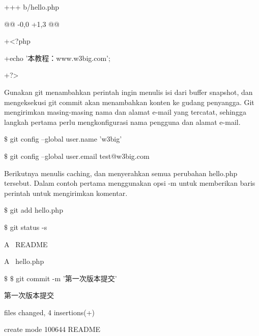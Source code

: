 \noindent 
{\fontsize{10pt}{10pt}\selectfont +++ b/hello.php} \par
\noindent 
{\fontsize{10pt}{10pt}\selectfont @@ -0,0 +1,3 @@} \par
\noindent 
{\fontsize{10pt}{10pt}\selectfont +<?php} \par
\noindent 
{\fontsize{10pt}{10pt}\selectfont +echo '本教程：www.w3big.com';} \par
\noindent 
{\fontsize{10pt}{10pt}\selectfont +?>} \par
\vspace{12pt}
Gunakan git menambahkan perintah ingin menulis isi dari buffer snapshot, dan mengeksekusi git commit akan menambahkan konten ke gudang penyangga. Git mengirimkan masing-masing nama dan alamat e-mail yang tercatat, sehingga langkah pertama perlu mengkonfigurasi nama pengguna dan alamat e-mail.  \par
\noindent 
{\fontsize{10pt}{10pt}\selectfont  $  \$  $ git config --global user.name 'w3big'} \par
\noindent 
{\fontsize{10pt}{10pt}\selectfont  $  \$  $ git config --global user.email test@w3big.com} \par
\noindent 
\vspace{12pt}
\noindent 
\vspace{12pt}
\noindent 
 \hspace*{0.64in} Berikutnya menulis caching, dan menyerahkan semua perubahan hello.php tersebut. Dalam contoh pertama menggunakan opsi -m untuk memberikan baris perintah untuk mengirimkan komentar. \par
\noindent 
{\fontsize{10pt}{10pt}\selectfont  $  \$  $ git add hello.php} \par
\noindent 
{\fontsize{10pt}{10pt}\selectfont  $  \$  $ git status -s} \par
\noindent 
{\fontsize{10pt}{10pt}\selectfont A~ README} \par
\noindent 
{\fontsize{10pt}{10pt}\selectfont A~ hello.php} \par
\noindent 
{\fontsize{10pt}{10pt}\selectfont  $  \$  $  $  \$  $ git commit -m '第一次版本提交'} \par
\noindent 
{\fontsize{10pt}{10pt} 第一次版本提交} \par
\noindent 
{\fontsize{10pt}{10pt} files changed, 4 insertions(+)} \par
\noindent 
{\fontsize{10pt}{10pt}\selectfont  create mode 100644 README} \par
\noindent 
